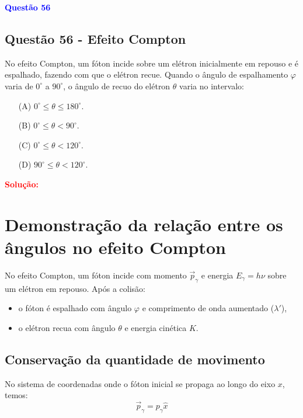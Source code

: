 \begin{flushleft}
\textbf{\textcolor{blue}{\Large Quest\~ao 56}}\\
\noindent
\subsection{Quest\~ao 56 - Efeito Compton}
No efeito Compton, um fóton incide sobre um elétron inicialmente em repouso e é espalhado, fazendo com que o elétron recue.  
Quando o ângulo de espalhamento \( \varphi \) varia de \(0^\circ\) a \(90^\circ\), o ângulo de recuo do elétron \( \theta \) 
varia no intervalo:


\begin{itemize}
\item[(A)] $0^{\circ} \leq \theta \leq 180^{\circ}$.
\item[(B)] $0^{\circ} \leq \theta < 90^{\circ}$.
\item[(C)] $0^{\circ} \leq \theta < 120^{\circ}$.
\item[(D)] $90^{\circ} \leq \theta < 120^{\circ}$.
\end{itemize}

\vspace{0.5cm}

\textcolor{red}{\textbf{Solução:}}\\

\section*{Demonstração da relação entre os ângulos no efeito Compton}

No efeito Compton, um fóton incide com momento \( \vec{p}_\gamma \) e energia \( E_\gamma = h\nu \) sobre um elétron em repouso.  
Após a colisão:
\begin{itemize}
    \item o fóton é espalhado com ângulo \( \varphi \) e comprimento de onda aumentado (\( \lambda' \)),
    \item o elétron recua com ângulo \( \theta \) e energia cinética \( K \).
\end{itemize}

\subsection*{Conservação da quantidade de movimento}

No sistema de coordenadas onde o fóton inicial se propaga ao longo do eixo \(x\), temos:
\[
\vec{p}_\gamma = p_\gamma \hat{x}
\]


\end{flushleft}
